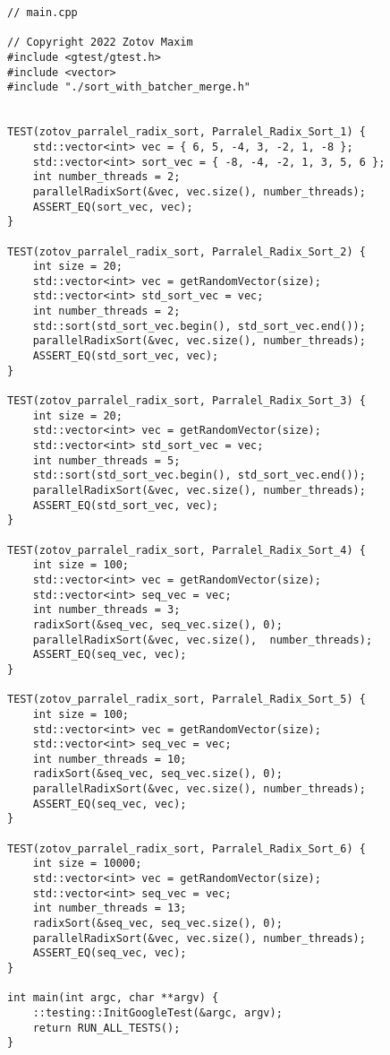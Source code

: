 \documentclass{report}
\begin{document}
\begin{lstlisting}
// main.cpp

// Copyright 2022 Zotov Maxim
#include <gtest/gtest.h>
#include <vector>
#include "./sort_with_batcher_merge.h"


TEST(zotov_parralel_radix_sort, Parralel_Radix_Sort_1) {
    std::vector<int> vec = { 6, 5, -4, 3, -2, 1, -8 };
    std::vector<int> sort_vec = { -8, -4, -2, 1, 3, 5, 6 };
    int number_threads = 2;
    parallelRadixSort(&vec, vec.size(), number_threads);
    ASSERT_EQ(sort_vec, vec);
}

TEST(zotov_parralel_radix_sort, Parralel_Radix_Sort_2) {
    int size = 20;
    std::vector<int> vec = getRandomVector(size);
    std::vector<int> std_sort_vec = vec;
    int number_threads = 2;
    std::sort(std_sort_vec.begin(), std_sort_vec.end());
    parallelRadixSort(&vec, vec.size(), number_threads);
    ASSERT_EQ(std_sort_vec, vec);
}

TEST(zotov_parralel_radix_sort, Parralel_Radix_Sort_3) {
    int size = 20;
    std::vector<int> vec = getRandomVector(size);
    std::vector<int> std_sort_vec = vec;
    int number_threads = 5;
    std::sort(std_sort_vec.begin(), std_sort_vec.end());
    parallelRadixSort(&vec, vec.size(), number_threads);
    ASSERT_EQ(std_sort_vec, vec);
}

TEST(zotov_parralel_radix_sort, Parralel_Radix_Sort_4) {
    int size = 100;
    std::vector<int> vec = getRandomVector(size);
    std::vector<int> seq_vec = vec;
    int number_threads = 3;
    radixSort(&seq_vec, seq_vec.size(), 0);
    parallelRadixSort(&vec, vec.size(),  number_threads);
    ASSERT_EQ(seq_vec, vec);
}

TEST(zotov_parralel_radix_sort, Parralel_Radix_Sort_5) {
    int size = 100;
    std::vector<int> vec = getRandomVector(size);
    std::vector<int> seq_vec = vec;
    int number_threads = 10;
    radixSort(&seq_vec, seq_vec.size(), 0);
    parallelRadixSort(&vec, vec.size(), number_threads);
    ASSERT_EQ(seq_vec, vec);
}

TEST(zotov_parralel_radix_sort, Parralel_Radix_Sort_6) {
    int size = 10000;
    std::vector<int> vec = getRandomVector(size);
    std::vector<int> seq_vec = vec;
    int number_threads = 13;
    radixSort(&seq_vec, seq_vec.size(), 0);
    parallelRadixSort(&vec, vec.size(), number_threads);
    ASSERT_EQ(seq_vec, vec);
}

int main(int argc, char **argv) {
    ::testing::InitGoogleTest(&argc, argv);
    return RUN_ALL_TESTS();
}
\end{lstlisting}
\end{document}

